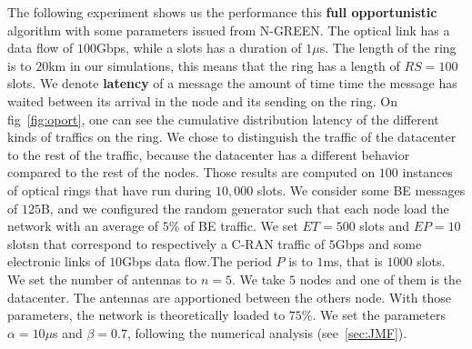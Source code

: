\documentclass[a4paper,10pt,french,english]{article}
\begin{document}
The following experiment shows us the performance this {\bf full opportunistic} algorithm with some parameters issued from N-GREEN. The optical link has a data flow of $100$Gbps, while a slots has a duration of $1\mu$s. The length of the ring is to $20$km in our simulations, this means that the ring has a length of $RS = 100$ slots. We denote {\bf latency} of a message the amount of time time the message has waited between its arrival in the node and its sending on the ring. On fig~\ref{fig:oport}, one can see the cumulative distribution latency of the different kinds of traffics on the ring. We chose to distinguish the traffic of the datacenter to the rest of the traffic, because the datacenter has a different behavior compared to the rest of the nodes. Those results are computed on $100$ instances of optical rings that have run during $10,000$ slots. We consider some BE messages of $125$B, and we configured the random generator such that each node load the network with an average of $5\%$ of BE traffic. We set $ET = 500$ slots and $EP = 10$ slotsn that correspond to respectively a C-RAN traffic of $5$Gbps and some electronic links of $10$Gbps data flow.The period  $P$ is to $1$ms, that is $1000$ slots. We set the number of antennas to $n=5$. We take $5$ nodes and one of them is the datacenter. The antennas are apportioned between the others node. With those parameters, the network is theoretically loaded to $75\%$. We set the parameters $\alpha = 10 \mu$s and $\beta = 0.7$, following the numerical analysis (see~\ref{sec:JMF}). 
\end{document}
